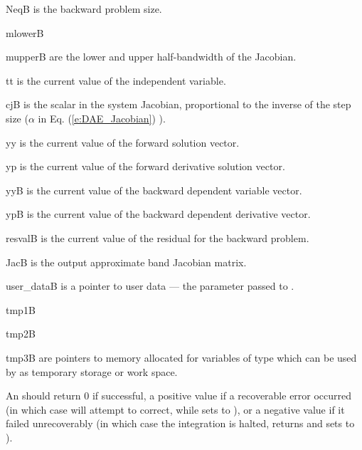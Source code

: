 {
  \begin{args}
  \item[NeqB]
    is the backward problem size.
  \item[mlowerB]
  \item[mupperB]
    are the lower and upper half-bandwidth of the Jacobian.
  \item[tt]
    is the current value of the independent variable.
  \item[cjB]
    is the scalar in the system Jacobian, proportional to the inverse of the
    step size ($\alpha$ in Eq. (\ref{e:DAE_Jacobian}) ).
  \item[yy]
    is the current value of the forward solution vector.
  \item[yp]
    is the current value of the forward derivative solution vector.
  \item[yyB]
    is the current value of the backward dependent variable vector.
  \item[ypB]
    is the current value of the backward dependent derivative vector.
  \item[resvalB]
    is the current value of the residual for the backward problem.
  \item[JacB]
    is the output approximate band Jacobian matrix. 
  \item[user\_dataB]
    is a pointer to user data --- the parameter passed to . 
  \item[tmp1B]
  \item[tmp2B]
  \item[tmp3B]
    are pointers to memory allocated  for variables of type  which 
    can be used by  as temporary storage or work space.    
  \end{args}
}
{
  An  should return 0 if successful, a positive value if a recoverable
  error occurred (in which case {\idas} will attempt to correct, while {\idaband} sets
   to ), or a negative 
  value if it failed unrecoverably (in which case the integration is halted, 
  returns  and {\idadense} sets  to
  ).
}
